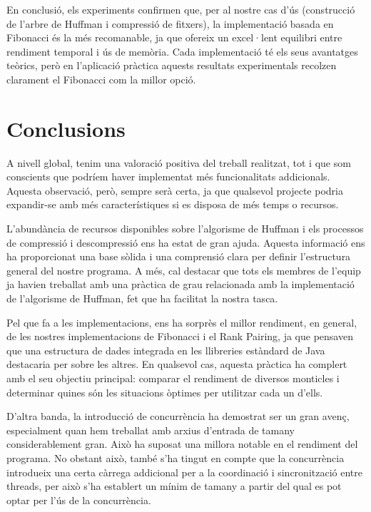 \documentclass{ieeetj}
\begin{document}
En conclusió, els experiments confirmen que, per al nostre cas d'ús (construcció de l'arbre de Huffman i compressió de fitxers), la implementació basada en Fibonacci és la més recomanable, ja que ofereix un excel·lent equilibri entre rendiment temporal i ús de memòria. Cada implementació té els seus avantatges teòrics, però en l'aplicació pràctica aquests resultats experimentals recolzen clarament el Fibonacci com la millor opció.

\section{Conclusions}

A nivell global, tenim una valoració positiva del treball realitzat, tot i que som conscients que podríem haver implementat més funcionalitats addicionals. Aquesta observació, però, sempre serà certa, ja que qualsevol projecte podria expandir-se amb més característiques si es disposa de més temps o recursos.\newline

L'abundància de recursos disponibles sobre l'algorisme de Huffman i els processos de compressió i descompressió ens ha estat de gran ajuda. Aquesta informació ens ha proporcionat una base sòlida i una comprensió clara per definir l'estructura general del nostre programa. A més, cal destacar que tots els membres de l'equip ja havien treballat amb una pràctica de grau relacionada amb la implementació de l'algorisme de Huffman, fet que ha facilitat la nostra tasca.\newline

Pel que fa a les implementacions, ens ha sorprès el millor rendiment, en general, de les nostres implementacions de Fibonacci i el Rank Pairing, ja que pensaven que una estructura de dades integrada en les llibreries estàndard de Java destacaria per sobre les altres. En qualsevol cas, aquesta pràctica ha complert amb el seu objectiu principal: comparar el rendiment de diversos monticles i determinar quines són les situacions òptimes per utilitzar cada un d'ells.\newline

D'altra banda, la introducció de concurrència ha demostrat ser un gran avenç, especialment quan hem treballat amb arxius d'entrada de tamany considerablement gran. Això ha suposat una millora notable en el rendiment del programa. No obstant això, també s'ha tingut en compte que la concurrència introdueix una certa càrrega addicional per a la coordinació i sincronització entre threads, per això s'ha establert un mínim de tamany a partir del qual es pot optar per l'ús de la concurrència.\newline
\end{document}
